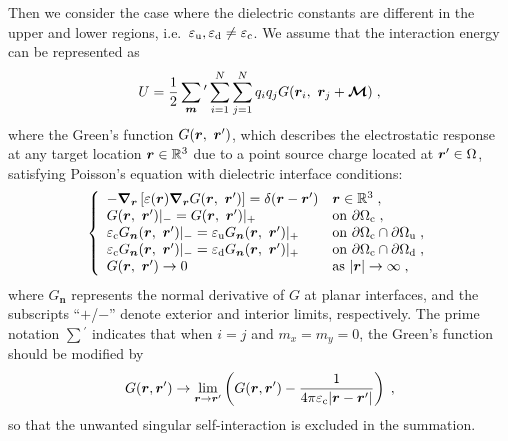 Then we consider the case where the dielectric constants are different in the upper and lower regions, i.e.~$\varepsilon_{\mathrm{u}}, \varepsilon_{\mathrm{d}} \neq \varepsilon_{\mathrm{c}}$.
We assume that the interaction energy can be represented as
\begin{equation}\label{eq:U_direct}
    U = \frac{1}{2} \sum_{\boldsymbol{m}} {}^\prime \sum_{i=1}^{N}\sum_{j=1}^{N} q_i q_j G(\boldsymbol{r}_i,~\boldsymbol{r}_j + \bm{\mathcal{M}})\;,
\end{equation}
where the Green's function $G(\boldsymbol{r},~\boldsymbol{r}^\prime)$, which describes the electrostatic response at any target location $\boldsymbol{r}\in\mathbb{R}^3$ due to a point source charge located at $\boldsymbol{r}^\prime\in\Omega$, satisfying Poisson's equation with dielectric interface conditions:
\begin{equation}
    \left\{
    \begin{array}{ll}
        - \boldsymbol{\nabla}_{\boldsymbol{r}} \left[ \varepsilon(\boldsymbol{r}) \boldsymbol{\nabla}_{\boldsymbol{r}} G(\boldsymbol{r},~\boldsymbol{r}^\prime) \right] = \delta(\boldsymbol{r} - \boldsymbol{r}^\prime) & \boldsymbol{r} \in \mathbb{R}^3 \;, \\
        G(\boldsymbol{r},~\boldsymbol{r}^\prime) |_{-} = G(\boldsymbol{r},~\boldsymbol{r}^\prime) |_{+} & \text{on}~\partial\Omega_{\text{c}}\;, \\
        \varepsilon_{\text{c}} G_{\bm{n}}(\boldsymbol{r},~\boldsymbol{r}^\prime) |_{-} = \varepsilon_{\text{u}}  G_{\bm{n}}(\boldsymbol{r},~\boldsymbol{r}^\prime) |_{+} & \text{on}~\partial \Omega_{\text{c}} \cap \partial \Omega_{\text{u}}\;, \\
        \varepsilon_{\text{c}} G_{\bm{n}}(\boldsymbol{r},~\boldsymbol{r}^\prime) |_{-} = \varepsilon_{\text{d}} G_{\bm{n}}(\boldsymbol{r},~\boldsymbol{r}^\prime) |_{+} & \text{on}~\partial \Omega_{\text{c}} \cap \partial \Omega_{\text{d}}\;, \\
        G(\boldsymbol{r},~\boldsymbol{r}^\prime) \to 0 & \text{as}~\lvert\boldsymbol{r}\rvert \to \infty\;,
    \end{array}
    \right.
    \label{eq:Poisson_G}
\end{equation}
where $G_{\bm{n}}$ represents the normal derivative of $G$ at planar interfaces, and the subscripts ``$+$/$-$'' denote exterior and interior limits, respectively. 
The prime notation $\sum{}^\prime$ indicates that when $i=j$ and $m_x = m_y = 0$, the Green's function should be modified by
\begin{equation}\label{eq::Green}
    G(\boldsymbol{r}, \boldsymbol{r}^\prime) \rightarrow \lim_{\boldsymbol{r} \to \boldsymbol{r}^\prime} \left(G(\boldsymbol{r}, \boldsymbol{r}^\prime) - \frac{1}{4\pi \varepsilon_{\text{c}}\lvert\boldsymbol{r} - \boldsymbol{r}^\prime\rvert} \right)\;,
\end{equation}
so that the unwanted singular self-interaction is excluded in the summation.


